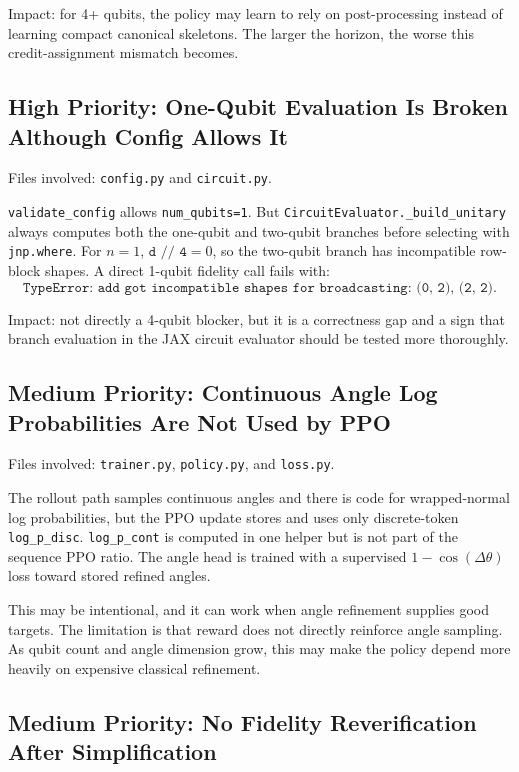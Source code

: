 \documentclass[11pt]{article}
\begin{document}
Impact: for 4+ qubits, the policy may learn to rely on post-processing instead
of learning compact canonical skeletons.  The larger the horizon, the worse this
credit-assignment mismatch becomes.

\subsection{High Priority: One-Qubit Evaluation Is Broken Although Config Allows It}

Files involved: \texttt{config.py} and \texttt{circuit.py}.

\texttt{validate\_config} allows \texttt{num\_qubits=1}.  But
\texttt{CircuitEvaluator.\_build\_unitary} always computes both the one-qubit and
two-qubit branches before selecting with \texttt{jnp.where}.  For \(n=1\),
\(\texttt{d // 4}=0\), so the two-qubit branch has incompatible row-block shapes.
A direct 1-qubit fidelity call fails with:
\[
  \texttt{TypeError: add got incompatible shapes for broadcasting: (0, 2), (2, 2).}
\]

Impact: not directly a 4-qubit blocker, but it is a correctness gap and a sign
that branch evaluation in the JAX circuit evaluator should be tested more
thoroughly.

\subsection{Medium Priority: Continuous Angle Log Probabilities Are Not Used by PPO}

Files involved: \texttt{trainer.py}, \texttt{policy.py}, and \texttt{loss.py}.

The rollout path samples continuous angles and there is code for wrapped-normal
log probabilities, but the PPO update stores and uses only discrete-token
\texttt{log\_p\_disc}.  \texttt{log\_p\_cont} is computed in one helper but is not
part of the sequence PPO ratio.  The angle head is trained with a supervised
\(1-\cos(\Delta\theta)\) loss toward stored refined angles.

This may be intentional, and it can work when angle refinement supplies good
targets.  The limitation is that reward does not directly reinforce angle
sampling.  As qubit count and angle dimension grow, this may make the policy
depend more heavily on expensive classical refinement.

\subsection{Medium Priority: No Fidelity Reverification After Simplification}
\end{document}
